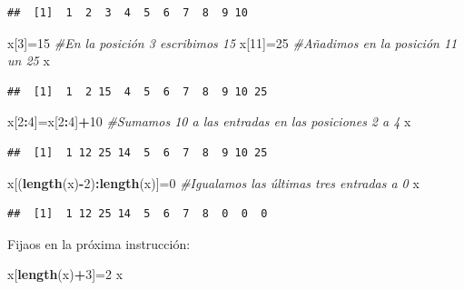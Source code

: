 \documentclass[]{book}
\newenvironment{Shaded}{\begin{snugshade}}{\end{snugshade}}
\newcommand{\CommentTok}[1]{\textcolor[rgb]{0.56,0.35,0.01}{\textit{#1}}}
\newcommand{\DecValTok}[1]{\textcolor[rgb]{0.00,0.00,0.81}{#1}}
\newcommand{\KeywordTok}[1]{\textcolor[rgb]{0.13,0.29,0.53}{\textbf{#1}}}
\newcommand{\NormalTok}[1]{#1}
\newcommand{\OperatorTok}[1]{\textcolor[rgb]{0.81,0.36,0.00}{\textbf{#1}}}
\theoremstyle{definition}
\theoremstyle{definition}
\theoremstyle{definition}
\theoremstyle{remark}
\begin{document}
\begin{verbatim}
##  [1]  1  2  3  4  5  6  7  8  9 10
\end{verbatim}

\begin{Shaded}
\begin{Highlighting}[]
\NormalTok{x[}\DecValTok{3}\NormalTok{]=}\DecValTok{15} \CommentTok{#En la posición 3 escribimos 15}
\NormalTok{x[}\DecValTok{11}\NormalTok{]=}\DecValTok{25} \CommentTok{#Añadimos en la posición 11 un 25}
\NormalTok{x}
\end{Highlighting}
\end{Shaded}

\begin{verbatim}
##  [1]  1  2 15  4  5  6  7  8  9 10 25
\end{verbatim}

\begin{Shaded}
\begin{Highlighting}[]
\NormalTok{x[}\DecValTok{2}\OperatorTok{:}\DecValTok{4}\NormalTok{]=x[}\DecValTok{2}\OperatorTok{:}\DecValTok{4}\NormalTok{]}\OperatorTok{+}\DecValTok{10} \CommentTok{#Sumamos 10 a las entradas en las posiciones 2 a 4}
\NormalTok{x}
\end{Highlighting}
\end{Shaded}

\begin{verbatim}
##  [1]  1 12 25 14  5  6  7  8  9 10 25
\end{verbatim}

\begin{Shaded}
\begin{Highlighting}[]
\NormalTok{x[(}\KeywordTok{length}\NormalTok{(x)}\OperatorTok{-}\DecValTok{2}\NormalTok{)}\OperatorTok{:}\KeywordTok{length}\NormalTok{(x)]=}\DecValTok{0}   \CommentTok{#Igualamos las últimas tres entradas a 0}
\NormalTok{x}
\end{Highlighting}
\end{Shaded}

\begin{verbatim}
##  [1]  1 12 25 14  5  6  7  8  0  0  0
\end{verbatim}

Fijaos en la próxima instrucción:

\begin{Shaded}
\begin{Highlighting}[]
\NormalTok{x[}\KeywordTok{length}\NormalTok{(x)}\OperatorTok{+}\DecValTok{3}\NormalTok{]=}\DecValTok{2}   
\NormalTok{x}
\end{Highlighting}
\end{Shaded}
\end{document}
